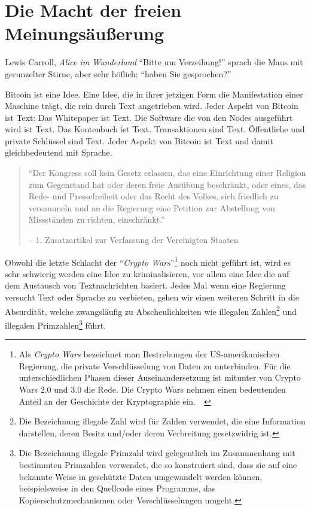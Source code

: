 \chapter{Die Macht der freien Meinungsäußerung}
\label{les:6}

\begin{chapquote}{Lewis Carroll, \textit{Alice im Wunderland}}
\enquote{Bitte um Verzeihung!} sprach die Maus mit gerunzelter Stirne,
aber sehr höflich; \enquote{haben Sie gesprochen?}
\end{chapquote}

Bitcoin ist eine Idee. Eine Idee, die in ihrer jetzigen Form die Manifestation
einer Maschine trägt, die rein durch Text angetrieben wird. Jeder Aspekt von
Bitcoin ist Text: Das Whitepaper ist Text. Die Software die von den Nodes
ausgeführt wird ist Text. Das Kontenbuch ist Text. Transaktionen sind Text.
Öffentliche und private Schlüssel sind Text. Jeder Aspekt von Bitcoin ist Text
und damit gleichbedeutend mit Sprache.

\begin{quotation}\begin{samepage}
\enquote{Der Kongress soll kein Gesetz erlassen, das eine Einrichtung einer
Religion zum Gegenstand hat oder deren freie Ausübung beschränkt, oder eines,
das Rede- und Pressefreiheit oder das Recht des Volkes, sich friedlich zu
versammeln und an die Regierung eine Petition zur Abstellung von Missständen zu
richten, einschränkt.}
\begin{flushright} -- 1. Zusatzartikel zur Verfassung der Vereinigten Staaten
\end{flushright}\end{samepage}\end{quotation}

Obwohl die letzte Schlacht der \enquote{\textit{Crypto Wars}}\footnote{Als \textit{Crypto
Wars} bezeichnet man Bestrebungen der US-amerikanischen Regierung, die private
Verschlüsselung von Daten zu unterbinden. Für die unterschiedlichen Phasen
dieser Auseinandersetzung ist mitunter von Crypto Wars 2.0 und 3.0 die Rede. Die
Crypto Wars nehmen einen bedeutenden Anteil an der Geschichte der Kryptographie
ein.~\cite{eff-cryptowars}~\cite{wiki:cryptowars}} noch nicht geführt ist, wird
es sehr schwierig werden eine Idee zu kriminalisieren, vor allem eine Idee die
auf dem Austausch von Textnachrichten basiert. Jedes Mal wenn eine Regierung
versucht Text oder Sprache zu verbieten, gehen wir einen weiteren Schritt in die
Absurdität, welche zwangsläufig zu Abscheulichkeiten wie illegalen
Zahlen\footnote{Die Bezeichnung illegale Zahl wird für Zahlen verwendet, die
eine Information darstellen, deren Besitz und/oder deren Verbreitung
gesetzwidrig ist.\cite{wiki:illegal-number}} und illegalen
Primzahlen\footnote{Die Bezeichnung illegale Primzahl wird gelegentlich im
Zusammenhang mit bestimmten Primzahlen verwendet, die so konstruiert sind, dass
sie auf eine bekannte Weise in geschützte Daten umgewandelt werden können,
beispielsweise in den Quellcode eines Programms, das Kopierschutzmechanismen
oder Verschlüsselungen umgeht.\cite{wiki:illegal-prime}} führt.

